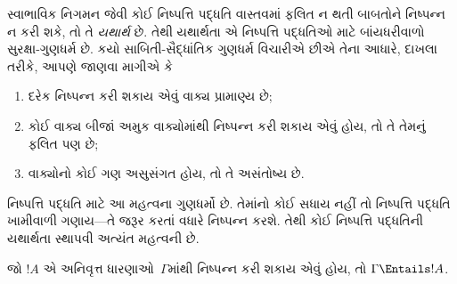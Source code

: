 \begingroup
\makeatletter{}\makeatother


\label{guunit:OLP-0095}


\begin{explain}
સ્વાભાવિક નિગમન જેવી કોઈ નિષ્પત્તિ પદ્ધતિ વાસ્તવમાં ફલિત ન થતી
બાબતોને નિષ્પન્ન ન કરી શકે, તો તે \emph{યથાર્થ} છે. તેથી યથાર્થતા
એ નિષ્પત્તિ પદ્ધતિઓ માટે બાંયધરીવાળો સુરક્ષા-ગુણધર્મ છે. કયો
સાબિતી-સૈદ્ધાંતિક ગુણધર્મ વિચારીએ છીએ તેના આધારે, દાખલા તરીકે, આપણે
જાણવા માગીએ કે
\begin{enumerate}
\item દરેક નિષ્પન્ન કરી શકાય એવું વાક્ય પ્રામાણ્ય છે;
\item કોઈ વાક્ય બીજાં અમુક વાક્યોમાંથી નિષ્પન્ન કરી શકાય એવું હોય, તો તે
  તેમનું ફલિત પણ છે;
\item વાક્યોનો કોઈ ગણ અસુસંગત હોય, તો તે અસંતોષ્ય છે.
\end{enumerate}
નિષ્પત્તિ પદ્ધતિ માટે આ મહત્વના ગુણધર્મો છે. તેમાંનો કોઈ સધાય
નહીં તો નિષ્પત્તિ પદ્ધતિ ખામીવાળી ગણાય---તે જરૂર કરતાં વધારે
નિષ્પન્ન કરશે. તેથી કોઈ નિષ્પત્તિ પદ્ધતિની યથાર્થતા સ્થાપવી
અત્યંત મહત્વની છે.
\end{explain}

\begin{thm}[યથાર્થતા]
જો $!A$ એ અનિવૃત્ત ધારણાઓ~$\Gamma$માંથી નિષ્પન્ન કરી શકાય એવું હોય,
તો $\Gamma \Entails !A$.
\end{thm}

